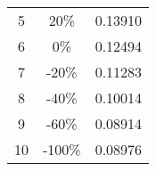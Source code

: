 \begin{longtable}[c]{ccc}
    5                                                                             & 20\%                                                                                & 0.13910                                                        \\
    6                                                                             & 0\%                                                                                 & 0.12494                                                        \\
    7                                                                             & {\color[HTML]{FE0000} -20\%}                                                        & 0.11283                                                        \\
    8                                                                             & {\color[HTML]{FE0000} -40\%}                                                        & 0.10014                                                        \\
    9                                                                             & {\color[HTML]{FE0000} -60\%}                                                        & 0.08914                                                        \\
    10                                                                            & {\color[HTML]{FE0000} -100\%}                                                       & 0.08976                                                        \\ \hline
\end{longtable}